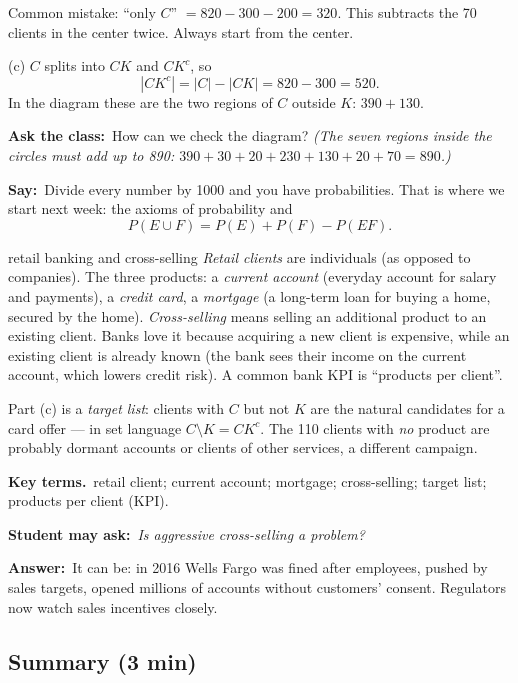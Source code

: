 \documentclass[11pt,a4paper,parskip=half]{scrartcl}
\newcommand{\terms}{\par\textbf{\color{plum}Key terms.}\ }
\newcommand{\sq}[1]{\par\textbf{\color{plum}Student may ask:}\ \emph{#1}\par}
\newcommand{\ans}{\textbf{Answer:}\ }
\newcommand{\say}{\textbf{\color{teal}Say:}\ }
\newcommand{\ask}{\textbf{\color{navy}Ask the class:}\ }
\newcommand{\slide}[1]{\marginpar{\raggedright\footnotesize\color{gray}slide #1}}
\begin{document}
\begin{cue}
	Common mistake: ``only $C$'' $= 820-300-200 = 320$. This subtracts the 70
	clients in the center twice. Always start from the center.
\end{cue}

(c) $C$ splits into $CK$ and $CK^c$, so
\[ |CK^c| = |C| - |CK| = 820-300 = 520. \]
In the diagram these are the two regions of $C$ outside $K$: $390+130$.

\ask How can we check the diagram? \emph{(The seven regions inside the
	circles must add up to 890: $390+30+20+230+130+20+70 = 890$.)}

\say Divide every number by 1000 and you have probabilities. That is where we
start next week: the axioms of probability and
\[ P(E\cup F) = P(E)+P(F)-P(EF). \]

\begin{bg}{retail banking and cross-selling}
	\emph{Retail clients} are individuals (as opposed to companies). The three
	products: a \emph{current account} (everyday account for salary and
	payments), a \emph{credit card}, a \emph{mortgage} (a long-term loan for
	buying a home, secured by the home). \emph{Cross-selling} means selling an
	additional product to an existing client. Banks love it because acquiring
	a new client is expensive, while an existing client is already known (the
	bank sees their income on the current account, which lowers credit risk).
	A common bank KPI is ``products per client''.

	Part (c) is a \emph{target list}: clients with $C$ but not $K$ are the
	natural candidates for a card offer --- in set language $C\setminus K =
		CK^c$. The 110 clients with \emph{no} product are probably dormant
	accounts or clients of other services, a different campaign.

	\terms retail client; current account; mortgage; cross-selling; target
	list; products per client (KPI).

	\sq{Is aggressive cross-selling a problem?}
	\ans It can be: in 2016 Wells Fargo was fined after employees, pushed by
	sales targets, opened millions of accounts without customers' consent.
	Regulators now watch sales incentives closely.
\end{bg}

\subsection{Summary (3 min)}\slide{35}
\end{document}
